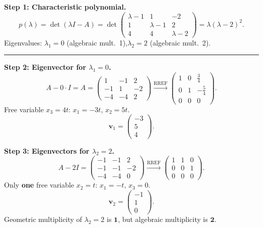 \documentclass[12pt,a3paper]{article}
\begin{document}
\begin{tcolorbox}[enhanced,breakable,
  colback=cE!4,colframe=cE,boxrule=0.8pt,arc=5pt,
  title={\textbf{Answer --- Eigenvalues, Eigenvectors \& Diagonalizability of
    $A=\begin{pmatrix}1&-1&2\\-1&1&-2\\-4&-4&2\end{pmatrix}$}},
  fonttitle=\bfseries\color{white},colbacktitle=cE]

\textbf{Step 1: Characteristic polynomial.}
\[
  p(\lambda) = \det(\lambda I - A)
  = \det\begin{pmatrix}\lambda-1&1&-2\\1&\lambda-1&2\\4&4&\lambda-2\end{pmatrix}
  = \lambda(\lambda-2)^2.
\]
Eigenvalues: $\lambda_1 = 0$ (algebraic mult.\ 1),\quad $\lambda_2 = 2$ (algebraic mult.\ 2).

\medskip\textcolor{cE}{\rule{\textwidth}{0.4pt}}

\textbf{Step 2: Eigenvector for $\lambda_1 = 0$.}
\[
  A - 0\cdot I = A = \begin{pmatrix}1&-1&2\\-1&1&-2\\-4&-4&2\end{pmatrix}
  \xrightarrow{\text{RREF}}
  \begin{pmatrix}1&0&\frac{3}{4}\\[2pt]0&1&-\frac{5}{4}\\0&0&0\end{pmatrix}.
\]
Free variable $x_3 = 4t$: $x_1 = -3t$, $x_2 = 5t$.
\[
  \mathbf{v}_1 = \begin{pmatrix}-3\\5\\4\end{pmatrix}.
\]

\textbf{Step 3: Eigenvectors for $\lambda_2 = 2$.}
\[
  A - 2I = \begin{pmatrix}-1&-1&2\\-1&-1&-2\\-4&-4&0\end{pmatrix}
  \xrightarrow{\text{RREF}}
  \begin{pmatrix}1&1&0\\0&0&1\\0&0&0\end{pmatrix}.
\]
Only \textbf{one} free variable $x_2 = t$: $x_1 = -t$, $x_3 = 0$.
\[
  \mathbf{v}_2 = \begin{pmatrix}-1\\1\\0\end{pmatrix}.
\]
Geometric multiplicity of $\lambda_2 = 2$ is $\mathbf{1}$, but algebraic multiplicity is $\mathbf{2}$.


\end{tcolorbox}
\end{document}
